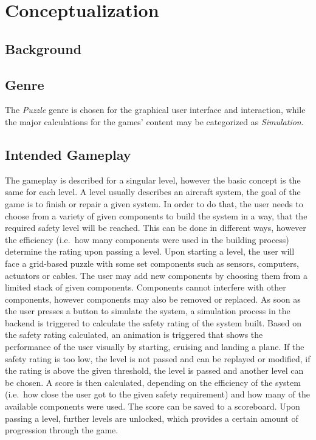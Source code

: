\chapter{Conceptualization}\label{ch:design}
\section{Background}\label{sec:background}
\section{Genre}\label{sec:genre}
The \textit{Puzzle} genre is chosen for the graphical user interface and interaction, while the major calculations for the
games' content may be categorized as \textit{Simulation}.

\section{Intended Gameplay}\label{sec:intended-gameplay}
The gameplay is described for a singular level, however the basic concept is the same for each level.
A level usually describes an aircraft system, the goal of the game is to finish or repair a given system.
In order to do that, the user needs to choose from a variety of given components to build the system in a way, that the
required safety level will be reached.
This can be done in different ways, however the efficiency (i.e.\ how many components were used in the building process) determine
the rating upon passing a level.
Upon starting a level, the user will face a grid-based puzzle with some set components such as sensors, computers, actuators
or cables.
The user may add new components by choosing them from a limited stack of given components.
Components cannot interfere with other components, however components may also be removed or replaced.
As soon as the user presses a button to simulate the system, a simulation process in the backend is triggered to calculate
the safety rating of the system built.
Based on the safety rating calculated, an animation is triggered that shows the performance of the user visually by starting, cruising
and landing a plane.
If the safety rating is too low, the level is not passed and can be replayed or modified, if the rating is above the given
threshold, the level is passed and another level can be chosen.
A score is then calculated, depending on the efficiency of the system (i.e.\ how close the user got to the given safety requirement) and
how many of the available components were used.
The score can be saved to a scoreboard.
Upon passing a level, further levels are unlocked, which provides a certain amount of progression through the game.

